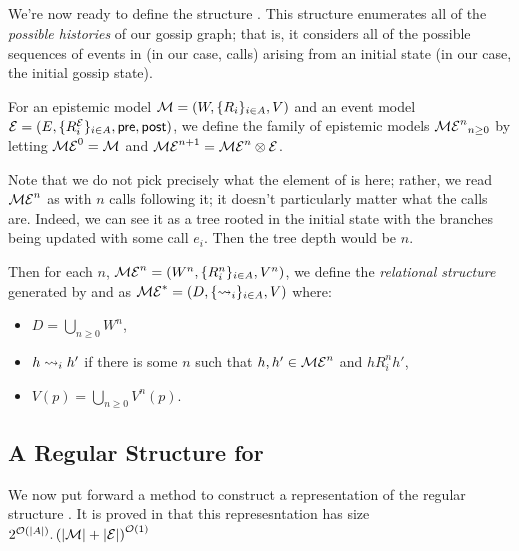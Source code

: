 \documentclass[12pt, a4paper]{article} %
\begin{document}
\subsection{}

We're now ready to define the structure . This structure enumerates all of the \textit{possible histories} of our gossip graph; that is, it considers all of the possible sequences of events in  (in our case, calls) arising from an initial state  (in our case, the initial gossip state).

For an epistemic model $\mathcal{M} = (W, \{R_i\}_{i \in A}, V)$ and an event model $\mathcal{E} = (E, \{R^{\mathcal{E}}_i\}_{i \in A}, \textsf{pre}, \textsf{post})$, we define the family of epistemic models ${\mathcal{ME}^n}_{n \geq 0}$ by letting $\mathcal{ME}^0 = \mathcal{M}$ and $\mathcal{ME}^{n+1} = \mathcal{ME}^n \otimes \mathcal{E}$. 

Note that we do not pick precisely what the element of  is here; rather, we read $\mathcal{ME}^n$ as  with $n$ calls following it; it doesn't particularly matter what the calls are. Indeed, we can see it as a tree rooted in the initial state  with the branches being  updated with some call $e_i$. Then the tree depth would be $n$. 

Then for each $n$, $\mathcal{ME}^n = (W^n, \{R_i^n\}_{i \in A}, V^n)$, we define the \textit{relational structure} generated by  and  as $\mathcal{ME}^\ast = (D, \{\rightsquigarrow_i\}_{i \in A}, V)$ where:

\begin{itemize}
    \item $D = \bigcup_{n \geq 0} W^n$,
    \item $h \rightsquigarrow_i h'$ if there is some $n$ such that $h, h' \in \mathcal{ME}^n$ and $h R_i^n h'$, %
    \item $V(p) = \bigcup_{n \geq 0} V^n(p)$.
\end{itemize}

\subsection{A Regular Structure for }
\label{subsec:regularME*}

We now put forward a method to construct a representation of the regular structure . It is proved in \cite{Aucher:2014} that this represesntation has size $2^{\mathcal{O}\left(|A|\right)}.\left(|\mathcal{M}| + |\mathcal{E}|\right)^{\mathcal{O}(1)}$
\end{document}
